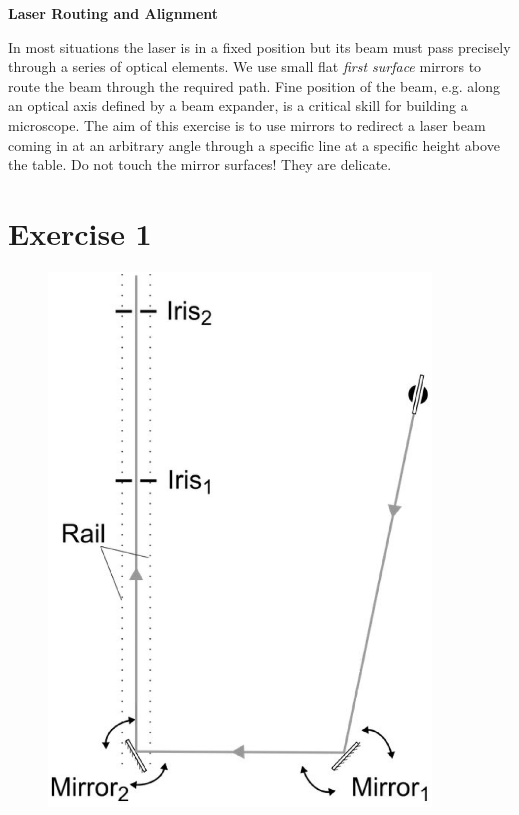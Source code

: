 \documentclass[a4paper]{report}
\begin{document}
\setcounter{secnumdepth}{2}

\begin{center}
\textbf{\Large{Laser Routing and Alignment}}
\end{center}

In most situations the laser is in a fixed position but its beam must pass precisely through a series of optical elements. 
We use small flat \textit{first surface} mirrors to route the beam through the required path. 
Fine position of the beam, e.g. along an optical axis defined by a beam expander, is a critical skill for building a microscope. 
The aim of this exercise is to use mirrors to redirect a laser beam coming in at an arbitrary angle through a specific line at a specific height above the table.
Do not touch the mirror surfaces! 
They are delicate.


\section{Exercise 1}

\begin{figure}[h]
\center
\includegraphics[width=4in]{laser_alignment_exercise_basic.eps}
\caption{}
\label{fig:ex1}
\end{figure}
\end{document}
